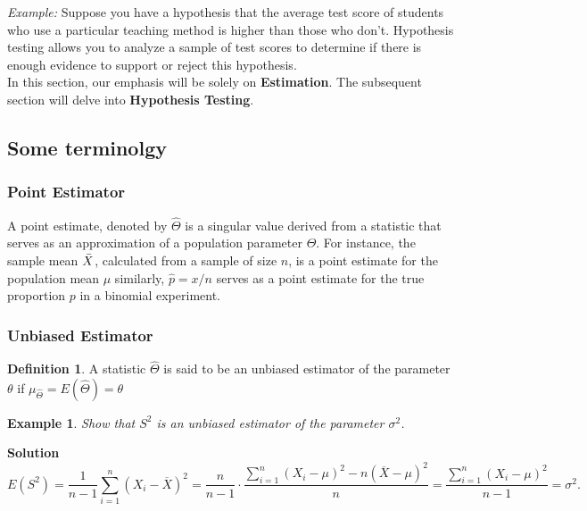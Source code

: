 \documentclass[12pt,a4paper]{article}
\theoremstyle{example}
\newtheorem{example}{Example}
\theoremstyle{definition}
\newtheorem{definition}{Definition}
\theoremstyle{theorem}
\begin{document}
       \textit{Example:} Suppose you have a hypothesis that the average test score of students who use a particular teaching method is higher than those who don't. Hypothesis testing allows you to analyze a sample of test scores to determine if there is enough evidence to support or reject this hypothesis.\\
In this section, our emphasis will be solely on \textbf{Estimation}. The subsequent section will delve into \textbf{Hypothesis Testing}.
\subsection{Some terminolgy}
\subsubsection{Point Estimator}
 A point estimate, denoted by $\hat{\Theta}$ is a singular value derived from a statistic  that serves as an approximation of a population parameter $\Theta$. For instance, the sample mean $\Bar{X}$, calculated from a sample of size $n$, is a point estimate for the population mean $\mu$ similarly, $\hat{p}=x/n$  serves as a point estimate for the true proportion $p$ in a binomial experiment.
 \subsubsection{Unbiased Estimator}
 \begin{definition}
     A statistic $\hat{\Theta}$ is said to be an unbiased estimator of the parameter $\theta$ if
$\mu_{\hat{\Theta}}=E(\hat{\Theta})=\theta$
 \end{definition}
 \begin{example}
     Show that $S^2$ is an unbiased estimator of the parameter $\sigma^2$.

 \end{example}
 \textbf{Solution }\\
 \[
E(S^2) = \frac{1}{n-1} \sum_{i=1}^{n} \left(X_i - \overline{X}\right)^2 = \frac{n}{n-1} \cdot \frac{\sum_{i=1}^{n} (X_i - \mu)^2 - n(\overline{X} - \mu)^2}{n} = \frac{\sum_{i=1}^{n} (X_i - \mu)^2}{n-1} = \sigma^2.
\]
\end{document}
